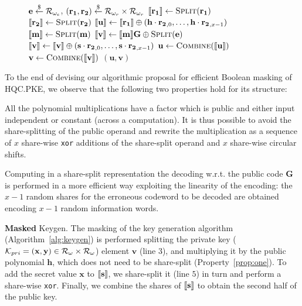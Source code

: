 \begin{figure}[!t]
\begin{minipage}{0.5\textwidth}
\begin{algorithm}[H]
        $\mathbf{e}  \stackrel{\$}{\gets}  \mathcal{R}_{\omega_e}$, 
        $(\mathbf{r_1},\mathbf{r_2})  \stackrel{\$}{\gets}  \mathcal{R}_{\omega_r} \times \mathcal{R}_{\omega_r}$\;
        $ \llbracket \mathbf{r_1} \rrbracket  \gets \text{\sc Split}(\mathbf{r_1})$\;
        $ \llbracket \mathbf{r_2} \rrbracket  \gets \text{\sc Split}(\mathbf{r_2})$\;
        $ \llbracket \mathbf{u} \rrbracket  \gets  \llbracket \mathbf{r_1} \rrbracket  \oplus 
        (\mathbf{h}\cdot\mathbf{r_2}_{,0},\ldots,\mathbf{h}\cdot\mathbf{r_2}_{,x-1})$\;
        $ \llbracket \mathbf{m} \rrbracket  \gets \text{\sc Split}(\mathbf{m})$\;
        $ \llbracket \mathbf{v} \rrbracket  \gets  \llbracket \mathbf{m} \rrbracket \mathbf{G}  \oplus \text{\sc Split}(\mathbf{e}) $\;
        $ \llbracket \mathbf{v} \rrbracket  \gets  \llbracket \mathbf{v} \rrbracket  \oplus (\mathbf{s}\cdot\mathbf{r_2}_{,0},\ldots,\mathbf{s}\cdot\mathbf{r_2}_{,x-1}) $\;
        $\mathbf{u} \gets \textsc{Combine}( \llbracket \mathbf{u} \rrbracket )$\;
        $\mathbf{v} \gets \textsc{Combine}( \llbracket \mathbf{v} \rrbracket )$\;
        \KwRet $(\mathbf{u},\mathbf{v})$\;
    \end{algorithm}
\end{minipage}
\vspace{-0.4cm}
\end{figure}
To the end of devising our algorithmic proposal for efficient Boolean masking
of HQC.PKE, we observe that the following two properties hold for its structure:
\begin{prop}\label{prop:one} All the polynomial multiplications have a factor 
which is public and either input independent or constant (across a computation). 
It is thus possible to avoid the share-splitting of the public operand and 
rewrite the multiplication as a sequence of $x$ share-wise \texttt{xor} 
additions of the share-split operand and $x$ share-wise circular shifts.
\end{prop}
\begin{prop}\label{prop:two} Computing in a share-split 
representation the decoding w.r.t. the public code $\mathbf{G}$ is  
performed in a more efficient way exploiting the linearity of the encoding: 
the $x-1$ random shares for the erroneous codeword to be decoded are obtained 
encoding $x-1$ random information words.
\end{prop}
\noindent\textbf{Masked} \textsf{Keygen}.
The masking of the key generation algorithm (Algorithm~\ref{alg:keygen}) is 
performed splitting the private key ($\mathcal{K}_{pri} = (\mathbf{x},\mathbf{y}) \in 
\mathcal{R}_\omega \times \mathcal{R}_\omega$) element $\mathbf{v}$ (line $3$), 
and multiplying it by the public polynomial $\mathbf{h}$, which does not need
to be share-split (Property~\ref{prop:one}). To add the secret value 
$\mathbf{x}$ to $ \llbracket \mathbf{s} \rrbracket $, we share-split it (line $5$) in turn 
and perform a share-wise \texttt{xor}. Finally, we combine the shares of 
$ \llbracket \mathbf{s} \rrbracket $ to obtain the second half of the public key.

